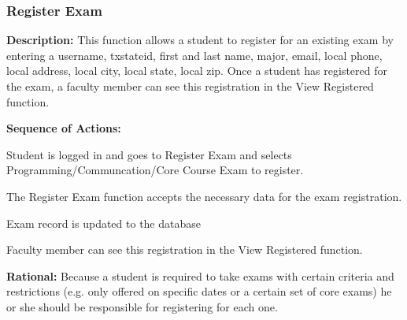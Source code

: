 \subsubsection{\large Register Exam} 
\begin{boxed} %
   \textbf{Description:}
   {\small This function allows a student to register for an existing exam by
         entering a username, txstateid, first and last name, major, email,
         local phone, local address, local city, local state, local zip.
         Once a student has registered for the exam, a faculty member can see
         this registration in the View Registered function.}
         
         \textbf{Sequence of Actions:}
         \begin{enumerate}
               {\small
            \item Student is logged in and goes to Register Exam and selects
               Programming/Communcation/Core Course Exam to register.
            \item The Register Exam function accepts the necessary data for the exam
               registration.
            \item Exam record is updated to the database
            \item Faculty member can see this registration in the View Registered
               function.}
         \end{enumerate}

         \textbf{Rational:}
         {\small Because a student is required to take exams with certain criteria and
         restrictions (e.g. only offered on specific dates or a certain set of
         core exams) he or she should be responsible for registering for each
      one.}
   \end{boxed} %

